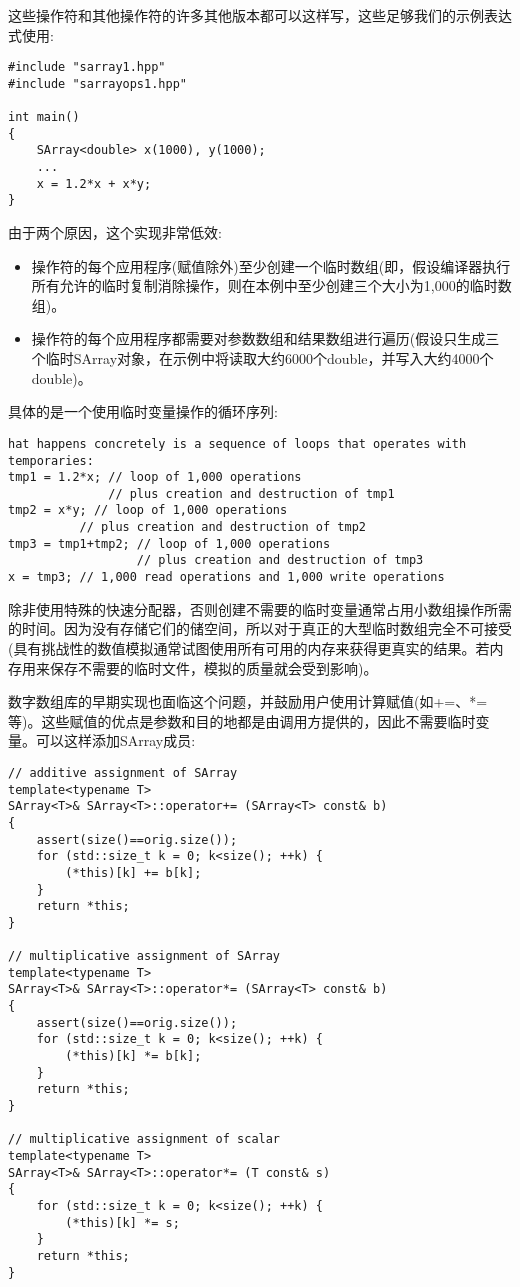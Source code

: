 这些操作符和其他操作符的许多其他版本都可以这样写，这些足够我们的示例表达式使用:

\begin{lstlisting}[style=styleCXX]
#include "sarray1.hpp"
#include "sarrayops1.hpp"

int main()
{
	SArray<double> x(1000), y(1000);
	...
	x = 1.2*x + x*y;
}
\end{lstlisting}

由于两个原因，这个实现非常低效:

\begin{itemize}
\item 
操作符的每个应用程序(赋值除外)至少创建一个临时数组(即，假设编译器执行所有允许的临时复制消除操作，则在本例中至少创建三个大小为1,000的临时数组)。

\item 
操作符的每个应用程序都需要对参数数组和结果数组进行遍历(假设只生成三个临时SArray对象，在示例中将读取大约6000个double，并写入大约4000个double)。
\end{itemize}

具体的是一个使用临时变量操作的循环序列:

\begin{lstlisting}[style=styleCXX]
hat happens concretely is a sequence of loops that operates with temporaries:
tmp1 = 1.2*x; // loop of 1,000 operations
			  // plus creation and destruction of tmp1
tmp2 = x*y; // loop of 1,000 operations
		  // plus creation and destruction of tmp2
tmp3 = tmp1+tmp2; // loop of 1,000 operations
				  // plus creation and destruction of tmp3
x = tmp3; // 1,000 read operations and 1,000 write operations
\end{lstlisting}

除非使用特殊的快速分配器，否则创建不需要的临时变量通常占用小数组操作所需的时间。因为没有存储它们的储空间，所以对于真正的大型临时数组完全不可接受(具有挑战性的数值模拟通常试图使用所有可用的内存来获得更真实的结果。若内存用来保存不需要的临时文件，模拟的质量就会受到影响)。

数字数组库的早期实现也面临这个问题，并鼓励用户使用计算赋值(如+=、*=等)。这些赋值的优点是参数和目的地都是由调用方提供的，因此不需要临时变量。可以这样添加SArray成员:

\begin{lstlisting}[style=styleCXX]
// additive assignment of SArray
template<typename T>
SArray<T>& SArray<T>::operator+= (SArray<T> const& b)
{
	assert(size()==orig.size());
	for (std::size_t k = 0; k<size(); ++k) {
		(*this)[k] += b[k];
	}
	return *this;
}

// multiplicative assignment of SArray
template<typename T>
SArray<T>& SArray<T>::operator*= (SArray<T> const& b)
{
	assert(size()==orig.size());
	for (std::size_t k = 0; k<size(); ++k) {
		(*this)[k] *= b[k];
	}
	return *this;
}

// multiplicative assignment of scalar
template<typename T>
SArray<T>& SArray<T>::operator*= (T const& s)
{
	for (std::size_t k = 0; k<size(); ++k) {
		(*this)[k] *= s;
	}
	return *this;
}
\end{lstlisting}

